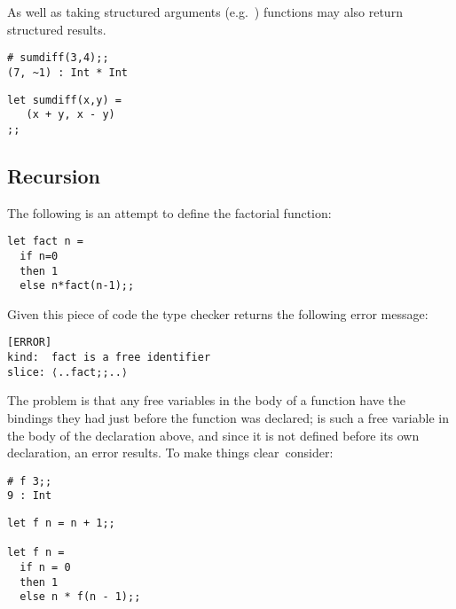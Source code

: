 \documentclass[11pt]{article}
\begin{document}
\noindent
As well as taking structured arguments (e.g.~) functions may also
return structured results.

\begin{session}
\emlsession
\begin{verbatim}
# sumdiff(3,4);;
(7, ~1) : Int * Int
\end{verbatim}
\emlfile
\begin{verbatim}
let sumdiff(x,y) =
   (x + y, x - y)
;;
\end{verbatim}
\emlend
\end{session}


\subsection {Recursion}

The following is an attempt to define the factorial function:

\begin{session}
\emlsession
\emlfile
\begin{verbatim}
let fact n =
  if n=0
  then 1
  else n*fact(n-1);;
\end{verbatim}
\emlend
\end{session}

Given this piece of code the type checker returns the following error
message:
\begin{emlerror}
\begin{verbatim}
[ERROR]
kind:  fact is a free identifier
slice: ⟨..fact;;..⟩
\end{verbatim}
\end{emlerror}



\noindent
The problem is that any free variables in the body of a function have the
bindings they
had just before the function was declared;  is such a free variable in
the body of the declaration above, and since it is not defined before its own
declaration, an error results.  To make things clear~consider:

\begin{session}
\emlsession
\begin{verbatim}
# f 3;;
9 : Int
\end{verbatim}
\emlfile
\begin{verbatim}
let f n = n + 1;;

let f n =
  if n = 0
  then 1
  else n * f(n - 1);;
\end{verbatim}
\emlend
\end{session}
\end{document}
